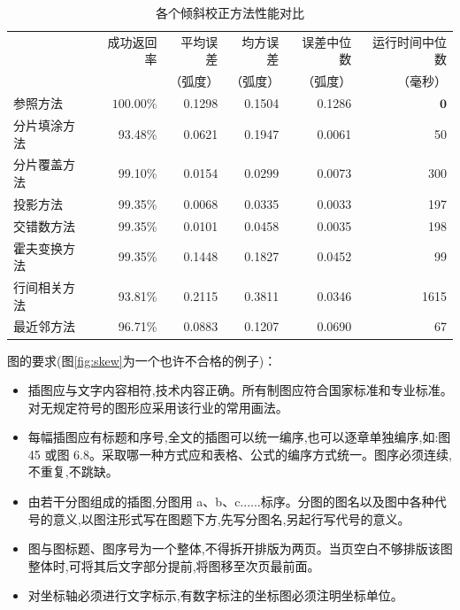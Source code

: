 ﻿\documentclass{sysuthesis}
\begin{document}
\begin{table}[hbp]
\caption{各个倾斜校正方法性能对比}
\centering
\begin{tabular}{lrrrrr}
\hline
& 成功返回率 & 平均误差& 均方误差& 误差中位数& 运行时间中位数\\
& & （弧度） & （弧度） & （弧度） & （毫秒）\\\hline
参照方法&$\mathbf{100.00\%}$&0.1298&0.1504&0.1286&$\mathbf{0}$\\
分片填涂方法&93.48\%&0.0621&0.1947&0.0061&50\\
分片覆盖方法&99.10\%&0.0154&$\mathbf{0.0299}$&0.0073&300\\
投影方法&99.35\%&$\mathbf{0.0068}$&0.0335&$\mathbf{0.0033}$&197\\
交错数方法&99.35\%&0.0101&0.0458&0.0035&198\\
霍夫变换方法&99.35\%&0.1448&0.1827&0.0452&99\\
行间相关方法&93.81\%&0.2115&0.3811&0.0346&1615\\
最近邻方法&96.71\%&0.0883&0.1207&0.0690&67\\\hline
\end{tabular}
\label{tab:skew}
\end{table}

图的要求(图\ref{fig:skew}为一个也许不合格的例子)：

\begin{itemize}
\item 插图应与文字内容相符,技术内容正确。所有制图应符合国家标准和专业标准。对无规定符号的图形应采用该行业的常用画法。
\item 每幅插图应有标题和序号,全文的插图可以统一编序,也可以逐章单独编序,如:图 45 或图 6.8。采取哪一种方式应和表格、公式的编序方式统一。图序必须连续,不重复,不跳缺。
\item 由若干分图组成的插图,分图用 a、b、c......标序。分图的图名以及图中各种代号的意义,以图注形式写在图题下方,先写分图名,另起行写代号的意义。
\item 图与图标题、图序号为一个整体,不得拆开排版为两页。当页空白不够排版该图整体时,可将其后文字部分提前,将图移至次页最前面。
\item 对坐标轴必须进行文字标示,有数字标注的坐标图必须注明坐标单位。
\end{itemize}
\end{document}
